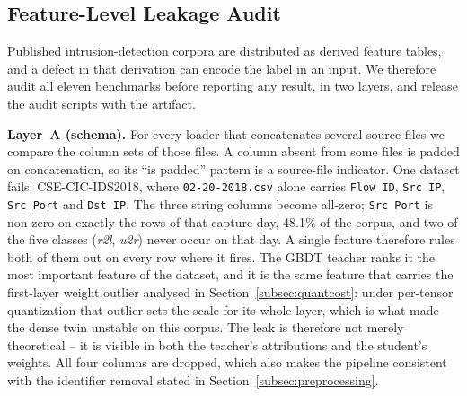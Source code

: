 
\subsection{Feature-Level Leakage Audit}
\label{subsec:audit}

Published intrusion-detection corpora are distributed as derived feature tables,
and a defect in that derivation can encode the label in an input. We therefore
audit all eleven benchmarks before reporting any result, in two layers, and
release the audit scripts with the artifact.

\textbf{Layer~A (schema).} For every loader that concatenates several source
files we compare the column sets of those files. A column absent from some files
is padded on concatenation, so its ``is padded'' pattern is a source-file
indicator. One dataset fails: \mbox{CSE-CIC-IDS2018}, where
\texttt{02-20-2018.csv} alone carries \texttt{Flow~ID}, \texttt{Src~IP},
\texttt{Src~Port} and \texttt{Dst~IP}. The three string columns become
all-zero; \texttt{Src~Port} is non-zero on exactly the rows of that capture day,
48.1\% of the corpus, and two of the five classes (\emph{r2l}, \emph{u2r}) never
occur on that day. A single feature therefore rules both of them out on every row
where it fires. The GBDT teacher ranks it the most important
feature of the dataset, and it is the same feature that carries the first-layer
weight outlier analysed in Section~\ref{subsec:quantcost}: under per-tensor
quantization that outlier sets the scale for its whole layer, which is what made
the dense twin unstable on this corpus. The leak is therefore not merely
theoretical -- it is visible in both the teacher's attributions and the
student's weights. All four
columns are dropped, which also makes the pipeline consistent with the
identifier removal stated in Section~\ref{subsec:preprocessing}.

